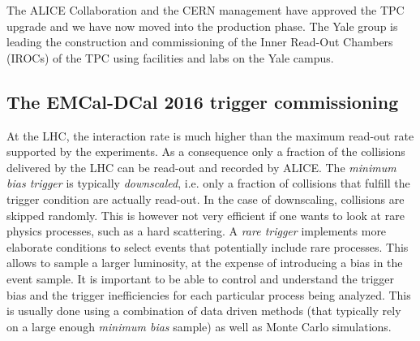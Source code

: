 \documentclass[12pt, a4paper, twoside, titlepage]{article}
\begin{document}
The ALICE Collaboration and the CERN management have approved the TPC upgrade and we have now moved into the production phase.
The Yale group is leading the construction and commissioning of the Inner Read-Out Chambers (IROCs) of the TPC using facilities and labs on the Yale campus.

\subsection{The EMCal-DCal 2016 trigger commissioning}
\label{sect:TriggerCommisioning}
At the LHC, the interaction rate is much higher than the maximum read-out rate supported by the experiments. As a consequence only a fraction of the collisions delivered
by the LHC can be read-out and recorded by ALICE. The \emph{minimum bias trigger} is typically \emph{downscaled}, i.e. only a fraction of collisions
that fulfill the trigger condition are actually read-out. In the case of downscaling, collisions are skipped randomly. This is however not very efficient
if one wants to look at rare physics processes, such as a hard scattering. A \emph{rare trigger} implements more elaborate conditions to select events that 
potentially include rare processes. This allows to sample a larger luminosity, at the expense of introducing a bias in the event sample. It is important
to be able to control and understand the trigger bias and the trigger inefficiencies for each particular process being analyzed. This is usually done
using a combination of data driven methods (that typically rely on a large enough \emph{minimum bias} sample) as well as Monte Carlo simulations.
\end{document}
